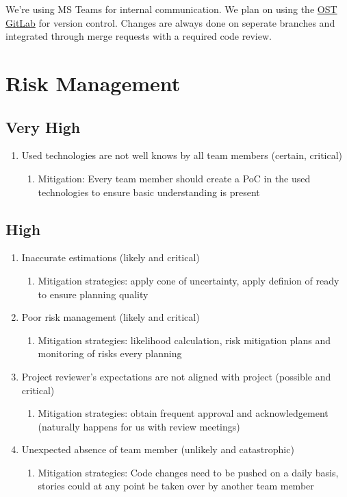 We're using MS Teams for internal communication.
We plan on using the \href{https://gitlab.ost.ch/SEProj/2022-FS/g02-jasstracker/jasstracker}{OST GitLab} for version control.
Changes are always done on seperate branches and integrated through merge requests with a required code review.

\section{Risk Management}

\subsection{Very High}
\begin{enumerate}
    \item Used technologies are not well knows by all team members (certain, critical) 
    \begin{enumerate}
        \item Mitigation: Every team member should create a PoC in the used technologies to ensure basic understanding is present 
    \end{enumerate}
\end{enumerate}

\subsection{High}
\begin{enumerate}
    \item Inaccurate estimations (likely and critical) 
    \begin{enumerate}
        \item Mitigation strategies: apply cone of uncertainty, apply definion of ready to ensure planning quality 
    \end{enumerate}

    \item Poor risk management (likely and critical)  
    \begin{enumerate}
        \item Mitigation strategies: likelihood calculation, risk mitigation plans and monitoring of risks every planning 
    \end{enumerate}

    \item Project reviewer's expectations are not aligned with project (possible and critical) 
    \begin{enumerate}
        \item Mitigation strategies: obtain frequent approval and acknowledgement (naturally happens for us with review meetings) 
    \end{enumerate}

    \item Unexpected absence of team member (unlikely and catastrophic) 
    \begin{enumerate}
        \item Mitigation strategies: Code changes need to be pushed on a daily basis, stories could at any point be taken over by another team member 
    \end{enumerate}
\end{enumerate}

